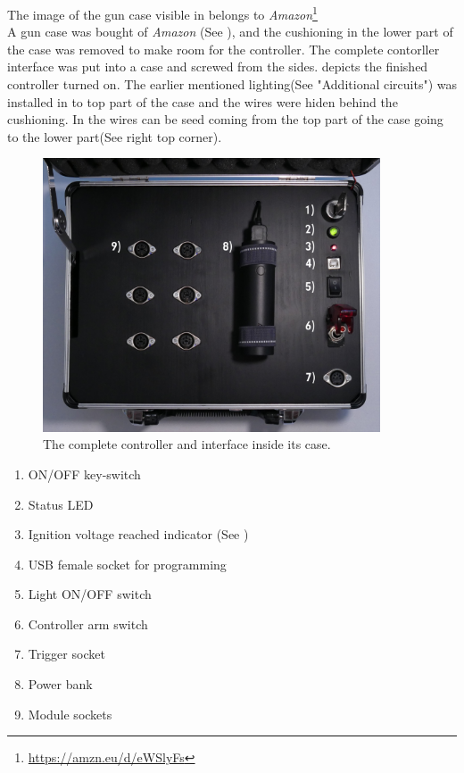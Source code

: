\noindent The image of the gun case visible in  belongs to \textit{Amazon}\footnote{\url{https://amzn.eu/d/eWSlyFs}}\\

\noindent A gun case was bought of \textit{Amazon} (See ), and the cushioning in the lower part of the case was removed to make room for the controller. The complete contorller interface was put into a case and screwed from the sides.  depicts the finished controller turned on. The earlier mentioned lighting(See  "Additional circuits") was installed in to top part of the case and the wires were hiden behind the cushioning. In  the wires can be seed coming from the top part of the case going to the lower part(See  right top corner).


\begin{figure}[!ht]
    \centering
    \includegraphics[width=10cm]{./Figures/controller_open_legend.png}
    \caption{ The complete controller and interface inside its case. }
    \label{fig:controller_open}     
\end{figure}

\begin{enumerate}
	\item ON/OFF key-switch
	\item Status LED 
	\item Ignition voltage reached indicator (See )
	\item USB female socket for programming
	\item Light ON/OFF switch
	\item Controller arm switch
	\item Trigger socket
	\item Power bank
	\item Module sockets
\end{enumerate}

